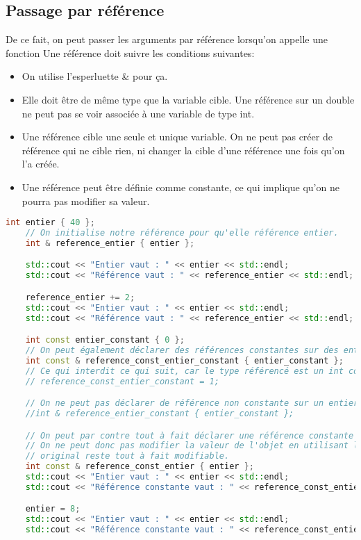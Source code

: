 \documentclass{article}
\begin{document}
\subsection{Passage par référence}
De ce fait, on peut passer les arguments par référence lorsqu'on appelle une fonction
Une référence doit suivre les conditions suivantes:
\begin{itemize}
    \item On utilise l’esperluette \& pour ça.
    \item Elle doit être de même type que la variable cible. Une référence sur un double ne peut pas se voir associée à une variable de type int.
    \item Une référence cible une seule et unique variable. On ne peut pas créer de référence qui ne cible rien, ni changer la cible d’une référence une fois qu’on l’a créée.
    \item Une référence peut être définie comme constante, ce qui implique qu’on ne pourra pas modifier sa valeur. 
\end{itemize}{}

\begin{lstlisting}[language=C++]
int entier { 40 };
    // On initialise notre référence pour qu'elle référence entier.
    int & reference_entier { entier };

    std::cout << "Entier vaut : " << entier << std::endl;
    std::cout << "Référence vaut : " << reference_entier << std::endl;

    reference_entier += 2;
    std::cout << "Entier vaut : " << entier << std::endl;
    std::cout << "Référence vaut : " << reference_entier << std::endl;

    int const entier_constant { 0 };
    // On peut également déclarer des références constantes sur des entiers constants.
    int const & reference_const_entier_constant { entier_constant };
    // Ce qui interdit ce qui suit, car le type référencé est un int const.
    // reference_const_entier_constant = 1;

    // On ne peut pas déclarer de référence non constante sur un entier constant.
    //int & reference_entier_constant { entier_constant };

    // On peut par contre tout à fait déclarer une référence constante sur un objet non constant.
    // On ne peut donc pas modifier la valeur de l'objet en utilisant la référence, mais l'entier
    // original reste tout à fait modifiable.
    int const & reference_const_entier { entier };
    std::cout << "Entier vaut : " << entier << std::endl;
    std::cout << "Référence constante vaut : " << reference_const_entier << std::endl;

    entier = 8;
    std::cout << "Entier vaut : " << entier << std::endl;
    std::cout << "Référence constante vaut : " << reference_const_entier << std::endl;

\end{lstlisting}{}
\end{document}
